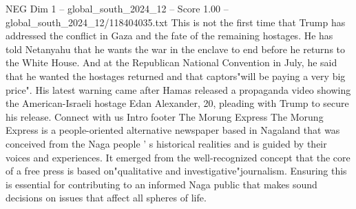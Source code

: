 \begin{textsample}{NEG Dim 1 – global\_south\_2024\_12 – Score 1.00 – global\_south\_2024\_12/118404035.txt}
This is not the first time that Trump has addressed the conflict in Gaza and the fate of the remaining hostages.
He has told Netanyahu that he wants the war in the enclave to end before he returns to the White House.
And at the Republican National Convention in July, he said that he wanted the hostages returned and that captors"will be paying a very big price".
His latest warning came after Hamas released a propaganda video showing the American-Israeli hostage Edan Alexander, 20, pleading with Trump to secure his release.
Connect with us Intro footer The Morung Express The Morung Express is a people-oriented alternative newspaper based in Nagaland that was conceived from the Naga people ' s historical realities and is guided by their voices and experiences.
It emerged from the well-recognized concept that the core of a free press is based on"qualitative and investigative"journalism.
Ensuring this is essential for contributing to an informed Naga public that makes sound decisions on issues that affect all spheres of life.

\end{textsample}
